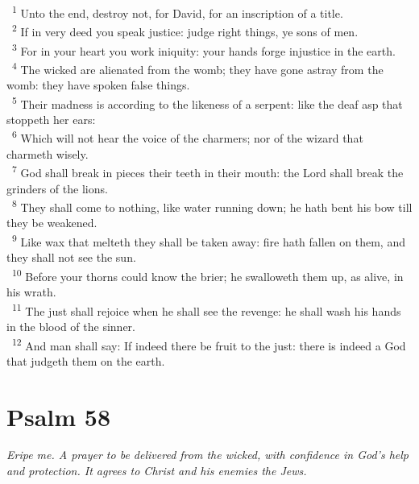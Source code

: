 \documentclass[a5paper,12pt]{article}
\begin{document}
\begin{multicols*}{2}
~\textsuperscript{1} Unto the end, destroy not, for David, for an inscription of a title.\\
~\textsuperscript{2} If in very deed you speak justice: judge right things, ye sons of men.\\
~\textsuperscript{3} For in your heart you work iniquity: your hands forge injustice in the earth.\\
~\textsuperscript{4} The wicked are alienated from the womb; they have gone astray from the womb: they have spoken false things.\\
~\textsuperscript{5} Their madness is according to the likeness of a serpent: like the deaf asp that stoppeth her ears:\\
~\textsuperscript{6} Which will not hear the voice of the charmers; nor of the wizard that charmeth wisely.\\
~\textsuperscript{7} God shall break in pieces their teeth in their mouth: the Lord shall break the grinders of the lions.\\
~\textsuperscript{8} They shall come to nothing, like water running down; he hath bent his bow till they be weakened.\\
~\textsuperscript{9} Like wax that melteth they shall be taken away: fire hath fallen on them, and they shall not see the sun.\\
~\textsuperscript{10} Before your thorns could know the brier; he swalloweth them up, as alive, in his wrath.\\
~\textsuperscript{11} The just shall rejoice when he shall see the revenge: he shall wash his hands in the blood of the sinner.\\
~\textsuperscript{12} And man shall say: If indeed there be fruit to the just: there is indeed a God that judgeth them on the earth.\\

\section{Psalm 58}
\label{sec:org10f6a01}
\emph{Eripe me. A prayer to be delivered from the wicked, with confidence in God's help and protection. It agrees to Christ and his enemies the Jews.}\\


\end{multicols*}
\end{document}
